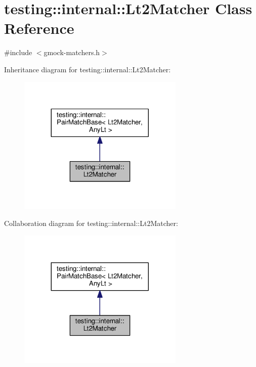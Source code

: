\hypertarget{classtesting_1_1internal_1_1Lt2Matcher}{}\section{testing\+:\+:internal\+:\+:Lt2\+Matcher Class Reference}
\label{classtesting_1_1internal_1_1Lt2Matcher}


{\ttfamily \#include $<$gmock-\/matchers.\+h$>$}



Inheritance diagram for testing\+:\+:internal\+:\+:Lt2\+Matcher\+:\nopagebreak
\begin{figure}[H]
\begin{center}
\leavevmode
\includegraphics[width=224pt]{classtesting_1_1internal_1_1Lt2Matcher__inherit__graph}
\end{center}
\end{figure}


Collaboration diagram for testing\+:\+:internal\+:\+:Lt2\+Matcher\+:\nopagebreak
\begin{figure}[H]
\begin{center}
\leavevmode
\includegraphics[width=224pt]{classtesting_1_1internal_1_1Lt2Matcher__coll__graph}
\end{center}
\end{figure}

